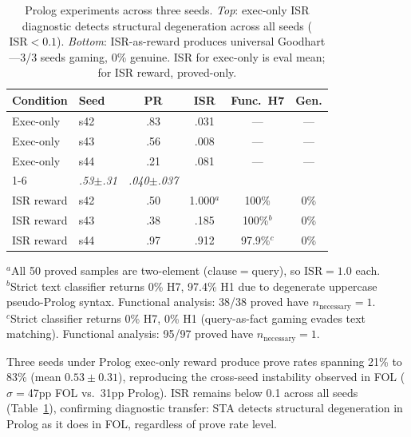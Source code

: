 \begin{table}[t]
\centering
\small
\caption{Prolog experiments across three seeds. \textit{Top}: exec-only ISR diagnostic detects structural degeneration across all seeds ($\text{ISR}{<}0.1$). \textit{Bottom}: ISR-as-reward produces universal Goodhart---3/3 seeds gaming, 0\% genuine. ISR for exec-only is eval mean; for ISR reward, proved-only.}
\label{tab:prolog}
\begin{tabular}{llcccc}
\toprule
\textbf{Condition} & \textbf{Seed} & \textbf{PR} & \textbf{ISR} & \textbf{Func.\ H7} & \textbf{Gen.} \\
\midrule
Exec-only & s42 & .83 & .031 & --- & --- \\
Exec-only & s43 & .56 & .008 & --- & --- \\
Exec-only & s44 & .21 & .081 & --- & --- \\
\cmidrule{1-6}
\multicolumn{2}{l}{\textit{Exec-only mean}} & \textit{.53${\scriptstyle\pm}$.31} & \textit{.040${\scriptstyle\pm}$.037} & & \\
\midrule
ISR reward & s42 & .50 & 1.000$^a$ & 100\% & 0\% \\
ISR reward & s43 & .38 & .185 & 100\%$^b$ & 0\% \\
ISR reward & s44 & .97 & .912 & 97.9\%$^c$ & 0\% \\
\bottomrule
\end{tabular}

\vspace{2pt}
\begin{minipage}{\columnwidth}
\footnotesize
$^a$All 50 proved samples are two-element (clause${=}$query), so $\text{ISR}{=}1.0$ each. \\
$^b$Strict text classifier returns 0\% H7, 97.4\% H1 due to degenerate uppercase pseudo-Prolog syntax. Functional analysis: 38/38 proved have $n_{\text{necessary}}{=}1$. \\
$^c$Strict classifier returns 0\% H7, 0\% H1 (query-as-fact gaming evades text matching). Functional analysis: 95/97 proved have $n_{\text{necessary}}{=}1$.
\end{minipage}
\end{table}

Three seeds under Prolog exec-only reward produce prove rates spanning 21\% to 83\% (mean $0.53 \pm 0.31$), reproducing the cross-seed instability observed in FOL ($\sigma{=}$47pp FOL vs.\ 31pp Prolog).
ISR remains below 0.1 across all seeds (Table~\ref{tab:prolog}), confirming diagnostic transfer: STA detects structural degeneration in Prolog as it does in FOL, regardless of prove rate level.

